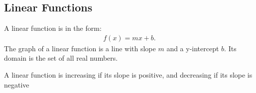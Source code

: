 \documentclass{report}
\begin{document}
%
%
%



\pagebreak \bigbreak \noindent
  \pagebreak \bigbreak \noindent
  \subsection{Linear Functions}
  A linear function is in the form:
  \begin{align*}
    f(x) = mx + b
  .\end{align*}
  \bigbreak \noindent 
  The graph of a linear function is a line with slope $m$ and a y-intercept $b$. Its domain is the set of all real numbers.
  
  \bigbreak \noindent 
  A linear function is increasing if its slope is positive, and decreasing if its slope is negative
  \bigbreak \noindent \bigbreak \noindent

  \bigbreak \noindent \bigbreak \noindent 
\end{document}
